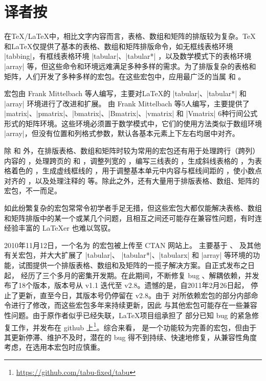 \documentclass[dvipsnames]{article}%
\begin{document}
\tableofcontents

\listoffigures

\listoftables

\clearpage

{}
\section*{译者按}

\bigskip

在\TeX /\LaTeX 中，相比文字内容而言，表格、数组和矩阵的排版较为复杂。\TeX 和\LaTeX 仅提供了基本的表格、数组和矩阵排版命令，如无框线表格环境 |tabbing|，有框线表格环境 |tabular|、|tabular*| ，以及数学模式下的表格环境 |array| 等，但这些命令和环境远难满足多种多样的需求。为了排版复杂的表格和矩阵，人们开发了多种多样的宏包。在这些宏包中，应用最广泛的当属  和 。

宏包由 Frank Mittelbach  等人编写，主要对\LaTeX 的 |tabular|、|tabular*| 和 |array| 环境进行了改进和扩展。 由 Frank Mittelbach 
等5人编写，主要提供了 |matrix|、|pmatrix|、|bmatrix|、|Bmatrix|、|vmatrix| 和 |Vmatrix| 6种行间公式形式的矩阵环境。这些环境必须置于数学模式中，它们的使用方法类似于数组环境 |array|，但没有位置和列格式参数，默认各基本元素上下左右均居中对齐。

除 和  外，在排版表格、数组和矩阵时较为常用的宏包还有用于处理跨行（跨列）内容的 ，处理跨页的  和 ，调整列宽的 ，编写三线表的 ，生成斜线表格的 ，为表格着色的 ，生成虚线框线的 ，用于调整基本单元中内容与框线间距的 ，使小数点对齐的 ，以及处理注释的  等。除此之外，还有大量用于排版表格、数组、矩阵的宏包，不一而足。

如此纷繁复杂的宏包常常令初学者手足无措，但这些宏包大都仅能解决表格、数组和矩阵排版中的某一个或某几个问题，且相互之间还可能存在兼容性问题，有时连经验丰富的 \LaTeX er 也难以驾驭。

2010年11月12日，一个名为  的宏包被上传至 CTAN 网站上。 主要基于 、  及其他有关宏包，并大大扩展了 |tabular|、 |tabular*|、|tabularx| 和 |array| 等环境的功能，试图提供一个排版表格、数组和及矩阵的一揽子解决方案。自正式发布之日起， 经历了三个多月的密集开发期。在此期间，不断修复 bug 、解耦依赖，并发布了18个版本，版本号从 v1.1 迭代至 v2.8。遗憾的是，自2011年2月26日起， 停止了更新，直至今日，其版本号仍停留在 v2.8。由于  对所依赖宏包的部分内部命令进行了修改，而这些宏包多年来持续更新，因此  与其他宏包可能存在一些兼容性问题。由于原作者似乎已经失联，\LaTeX 项目组承担了  部分已知 bug 的紧急修复工作，并发布在 github 上\footnote{\url{https://github.com/tabu-fixed/tabu}}。综合来看，  是一个功能较为完善的宏包，但由于其更新停滞、维护不及时，潜在的 bug 得不到持续、快速地修复，从兼容性角度考虑，在选用本宏包时应慎重。
\end{document}

